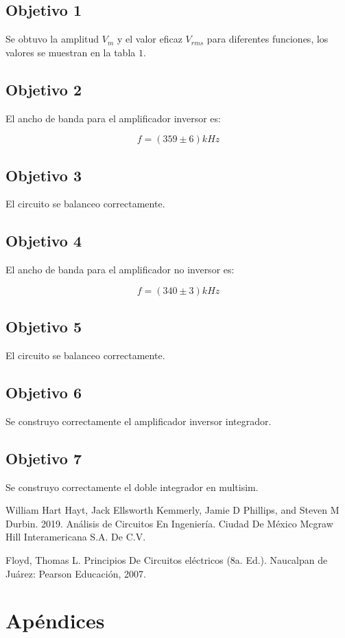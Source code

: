 \documentclass[DIV=calc, paper=a4, fontsize=11pt]{scrartcl}
\begin{document}
\begin{multicols}{2}
\subsection*{Objetivo 1}
Se obtuvo la amplitud $V_{m}$ y el valor eficaz $V_{rms}$ para diferentes funciones, los valores se muestran en la tabla $1$.

\subsection*{Objetivo 2}
  El ancho de banda para el amplificador inversor es:
  
  \begin{equation*}
    f= (359\pm6) kHz
\end{equation*}

\subsection*{Objetivo 3}
El circuito se balanceo correctamente.

\subsection*{Objetivo 4}

  El ancho de banda para el amplificador no inversor es:
  
  \begin{equation*}
    f= (340\pm3) kHz
\end{equation*}

\subsection*{Objetivo 5}
El circuito se balanceo correctamente.

\subsection*{Objetivo 6}
Se construyo correctamente el amplificador inversor integrador.

\subsection*{Objetivo 7}
Se construyo correctamente el doble integrador en multisim.

\begin{thebibliography}{99}
 William Hart Hayt, Jack Ellsworth Kemmerly, Jamie D Phillips, and Steven M Durbin. 2019. Análisis de Circuitos En Ingeniería. Ciudad De México Mcgraw Hill Interamericana S.A. De C.V.

 Floyd, Thomas L. Principios De Circuitos eléctricos (8a. Ed.). Naucalpan de Juárez: Pearson Educación, 2007.
\end{thebibliography}

\section*{Apéndices}

\end{multicols}
\end{document}
